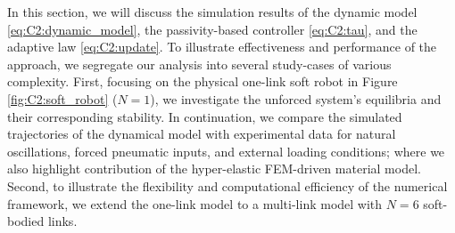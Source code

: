 \noindent In this section, we will discuss the simulation results of the dynamic model \eqref{eq:C2:dynamic_model}, the passivity-based controller \eqref{eq:C2:tau}, and the adaptive law \eqref{eq:C2:update}. To illustrate effectiveness and performance of the approach, we segregate our analysis into several study-cases of various complexity. First, focusing on the physical one-link soft robot in Figure \ref{fig:C2:soft_robot} ($N = 1$), we investigate the unforced system's equilibria and their corresponding stability. In continuation, we compare the simulated trajectories of the dynamical model with experimental data for natural oscillations, forced pneumatic inputs, and external loading conditions; where we also highlight contribution of the hyper-elastic FEM-driven material model. Second, to illustrate the flexibility and computational efficiency of the numerical framework, we extend the one-link model to a multi-link model with $N = 6$ soft-bodied links.

